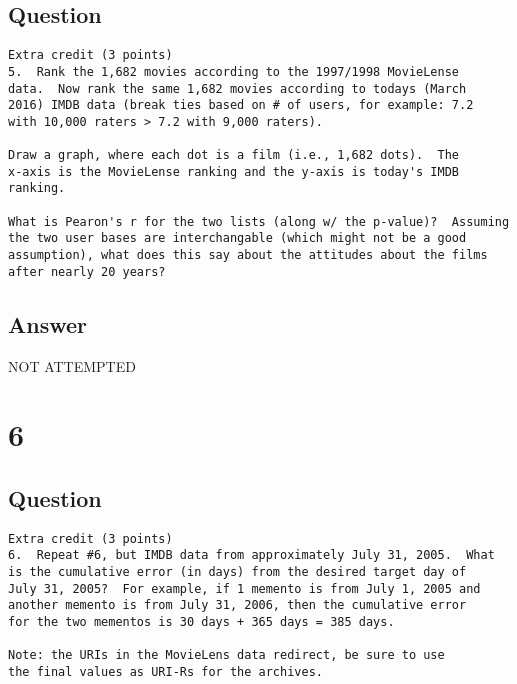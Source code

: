 \documentclass[letterpaper,11pt]{article}
\begin{document}
\subsection*{Question}

\begin{verbatim}
Extra credit (3 points)
5.  Rank the 1,682 movies according to the 1997/1998 MovieLense
data.  Now rank the same 1,682 movies according to todays (March
2016) IMDB data (break ties based on # of users, for example: 7.2
with 10,000 raters > 7.2 with 9,000 raters).

Draw a graph, where each dot is a film (i.e., 1,682 dots).  The
x-axis is the MovieLense ranking and the y-axis is today's IMDB
ranking.

What is Pearon's r for the two lists (along w/ the p-value)?  Assuming
the two user bases are interchangable (which might not be a good
assumption), what does this say about the attitudes about the films
after nearly 20 years?
\end{verbatim}

\subsection*{Answer}

\begin{center}
\Huge{NOT ATTEMPTED}
\end{center}


\clearpage


\section*{6}

\subsection*{Question}

\begin{verbatim}
Extra credit (3 points)
6.  Repeat #6, but IMDB data from approximately July 31, 2005.  What
is the cumulative error (in days) from the desired target day of
July 31, 2005?  For example, if 1 memento is from July 1, 2005 and 
another memento is from July 31, 2006, then the cumulative error 
for the two mementos is 30 days + 365 days = 385 days.

Note: the URIs in the MovieLens data redirect, be sure to use
the final values as URI-Rs for the archives.
\end{verbatim}
\end{document}
